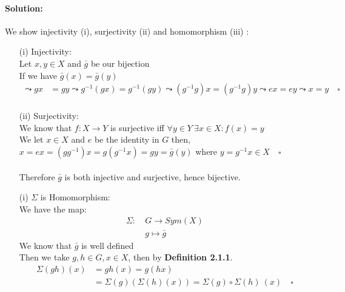 \documentclass{article}
\begin{document}
\paragraph{Solution:} We show injectivity (i), surjectivity (ii) and homomorphism (iii) :

    \begin{enumerate}
        \item[(i)] Injectivity:\\
            \linebreak
            Let $x,y \in X$ and  $\bar g$ be our bijection\\
            If we have $\bar g(x) = \bar g(y)$
                \begin{equation*}
                    \begin{aligned}
                        \leadsto gx &= gy \leadsto g^{-1}(gx) = g^{-1}(gy) \leadsto (g^{-1}g)x = (g^{-1}g)y \leadsto ex = ey \leadsto x=y\quad \square\\
                    \end{aligned}
                \end{equation*}
        \item[(ii)] Surjectivity:\\
            \linebreak
            We know that $f: X \rightarrow Y$ is surjective iff $\forall y \in Y\ \exists x \in X: f(x)=y$ \\
            We let $x \in X$ and $e$ be the identity in $G$ then, \\
            $x = ex = (gg^{-1})x = g(g^{-1}x) = gy = \bar g(y)$ where $ y = g^{-1}x \in X \quad \square$ \\ 
            \\Therefore $\bar g$ is both injective and surjective, hence bijective. \\
        \item[(i)] $\Sigma$ is Homomorphism:\\
            \linebreak
            We have the map:
            \begin{equation*}
                \begin{aligned}
                     \Sigma:\ &G \rightarrow Sym(X)\\
                              & g \mapsto \bar g
                \end{aligned}
            \end{equation*}
            We know that $\bar g$ is well defined\\
            Then we take $g, h \in G, x \in X$, then by \textbf{Definition 2.1.1}.\\
            \begin{equation*}
                \begin{aligned}
                    \Sigma(gh)(x)& = gh(x) = g(hx)\\
                                 & = \Sigma(g)(\Sigma(h)(x)) = \Sigma(g) \circ \Sigma(h) \ (x) \quad \square
                \end{aligned}
            \end{equation*}
        \end{enumerate}
\end{document}
